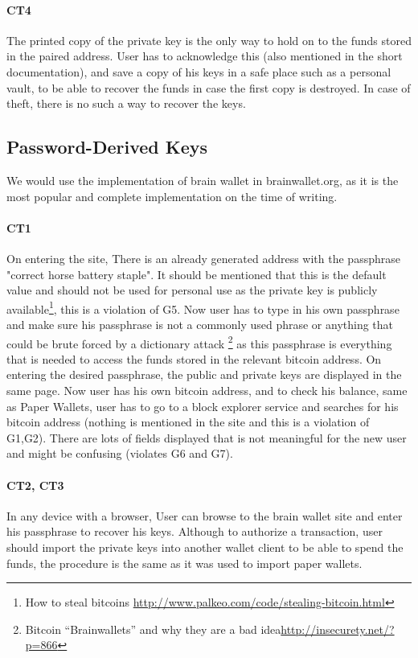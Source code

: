 \paragraph{CT4} The printed copy of the private key is the only way to hold on to the funds stored in the paired address. User has to acknowledge this (also mentioned in the short documentation), and save a copy of his keys in a safe place such as a personal vault, to be able to recover the funds in case the first copy is destroyed. In case of theft, there is no such a way to recover the keys.


\subsection{Password-Derived Keys} We would use the implementation of brain wallet in brainwallet.org, as it is the most popular and complete implementation on the time of writing.

\paragraph{CT1} On entering the site, There is an already generated address with the passphrase "correct horse battery staple". It should be mentioned that this is the default value and should not be used for personal use as the private key is publicly available\footnote{How to steal bitcoins \url{http://www.palkeo.com/code/stealing-bitcoin.html}}, this is a violation of G5. Now user has to type in his own passphrase and make sure his passphrase is not a commonly used phrase or anything that could be brute forced by a dictionary attack \footnote{Bitcoin “Brainwallets” and why they are a bad idea\url{http://insecurety.net/?p=866}} as this passphrase is everything that is needed to access the funds stored in the relevant bitcoin address. On entering the desired passphrase, the public and private keys are displayed in the same page. Now user has his own bitcoin address, and to check his balance, same as Paper Wallets, user has to go to a block explorer service and searches for his bitcoin address (nothing is mentioned in the site and this is a violation of G1,G2). There are lots of fields displayed that is not meaningful for the new user and might be confusing (violates G6 and G7).

\paragraph{CT2, CT3} In any device with a browser, User can browse to the brain wallet site and enter his passphrase to recover his keys. Although to authorize a transaction, user should import the private keys into another wallet client to be able to spend the funds, the procedure is the same as it was used to import paper wallets.

